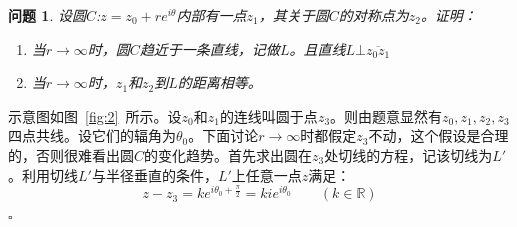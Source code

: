 \documentclass{article}
\newtheorem{QUESTION}{问题}
\newenvironment{SOLUTION}[1][{}]{{\noindent\heiti 解#1：}}{\hfill $\square$\par}
\begin{document}
    \begin{QUESTION}
    设圆$C$:$z=z_0+re^{i\theta}$内部有一点$z_1$，其关于圆$C$的对称点为$z_2$。证明：
    \begin{enumerate}
    \item 当$r\rightarrow\infty$时，圆$C$趋近于一条直线，记做$L$。且直线$L\bot\overline{z_0z_1}$
    \item 当$r\rightarrow\infty$时，$z_1$和$z_2$到$L$的距离相等。
    \end{enumerate}
    \end{QUESTION}
    \begin{SOLUTION}[法1] 示意图如图~\ref{fig:2}~所示。设$z_0$和$z_1$的连线叫圆于点$z_3$。则由题意显然有$z_0,z_1,z_2,z_3$四点共线。设它们的辐角为$\theta_0$。下面讨论$r\rightarrow\infty$时都假定$z_3$不动，这个假设是合理的，否则很难看出圆$C$的变化趋势。首先求出圆在$z_3$处切线的方程，记该切线为$L'$。利用切线$L'$与半径垂直的条件，$L'$上任意一点$z$满足：
    \begin{equation}
    z-z_3=ke^{i\theta_0+\frac{\pi}{2}}=kie^{i\theta_0}\qquad(k\in\mathbb{R})
    \label{equ:line}
    \end{equation}
    
    
    

\end{SOLUTION}
\end{document}
